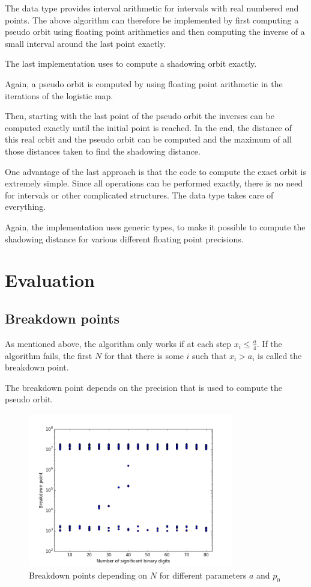   The data type provides interval arithmetic for intervals with real numbered end points. 
  The above algorithm can therefore be implemented by first computing a pseudo
  orbit using floating point arithmetics and then computing the inverse of a
  small interval around the last point exactly.

  The last implementation uses \irram to compute a shadowing orbit exactly.

  Again, a pseudo orbit is computed by using floating point arithmetic in the
  iterations of the logistic map.

  Then, starting with the last point of the pseudo orbit the inverses can be computed exactly until the initial point is reached.
  In the end, the distance of this real orbit and the pseudo orbit can be
  computed and the maximum of all those distances taken to find the shadowing
  distance.

  One advantage of the last approach is that the \irram code to compute the exact orbit is extremely simple. 
  Since all operations can be performed exactly, there is no need for intervals
  or other complicated structures. 
  The data type \real takes care of everything.

  Again, the implementation uses generic types, to make it possible to compute
  the shadowing distance for various different floating point precisions.
\section{Evaluation}
  \subsection{Breakdown points}
  As mentioned above, the algorithm only works if at each step $x_i \leq
  \frac{a}{4}$.  
  If the algorithm fails, the first $N$ for that there is some $i$ such that
  $x_i > a_i$ is called the breakdown point.

  The breakdown point depends on the precision that is used to compute the pseudo orbit. 
  \begin{figure}[h]
    \centering
    \includegraphics[width=0.8\textwidth]{img/dynamic_systems/breakdown}
    \caption{Breakdown points depending on $N$ for different parameters $a$ and
    $p_0$}\label{fig:breakdown}
  \end{figure}

